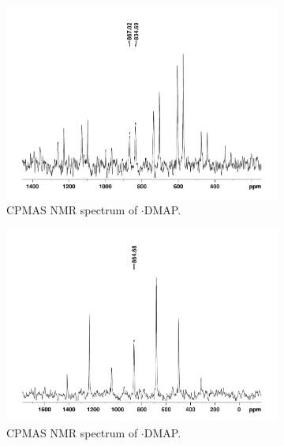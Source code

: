 \begin{refsection}
\begin{figure}
  \centering
  \begin{subfigure}{\linewidth}
    \centering
    \includegraphics[height=0.28\textheight]{Figures/ebs-4ome-dmap-cpmas-77se.pdf}
    \caption{ CPMAS NMR spectrum of $ \cdot $DMAP.}
  \end{subfigure}
  \begin{subfigure}{\linewidth}
    \centering
    \includegraphics[height=0.28\textheight]{Figures/ebs-ph-dmap-cpmas-77se.pdf}
    \caption{ CPMAS NMR spectrum of $ \cdot $DMAP.}
  \end{subfigure}
  \begin{subfigure}{\linewidth}
    \centering

\end{subfigure}
\end{figure}
\end{refsection}
